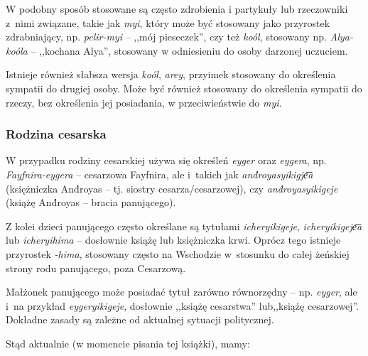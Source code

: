 \begin{spacing}{1.1}
W podobny sposób stosowane są często zdrobienia i partykuły lub rzeczowniki
z~nimi związane, takie jak \emph{myi}, który może być stosowany jako przyrostek
zdrabniający, np. \emph{pelir-myi} -- ,,mój pieseczek'', czy też \emph{koól},
stosowany np. \emph{Alya-koóla} -- ,,kochana Alya'', stosowany w odniesieniu do
osoby darzonej uczuciem.

Istnieje również słabsza wersja \emph{koól}, \emph{arey}, przyimek stosowany do
określenia sympatii do drugiej osoby. Może być również stosowany do określenia
sympatii do rzeczy, bez określenia jej posiadania, w przeciwieństwie do
\emph{myi}.

\subsubsection{Rodzina cesarska}

W przypadku rodziny cesarskiej używa się określeń \emph{eyger} oraz
\emph{eygera}, np. \emph{Fayfnira-eygera} -- cesarzowa Fayfnira, ale i~takich
jak \emph{and́royasyikigje͞a} (księżniczka And́royas -- tj. siostry
cesarza/cesarzowej), czy \emph{and́royasyikigeje} (książę And́royas -- bracia
panującego).

Z kolei dzieci panującego często określane są tytułami \emph{icheryikigeje},
\emph{icheryikigeje͞a} lub \emph{icheryihima} -- dosłownie książę lub
księżniczka krwi. Oprócz tego istnieje przyrostek \emph{-hima}, stosowany często
na Wschodzie w~stosunku do całej żeńskiej strony rodu panującego, poza
Cesarzową.

Małżonek panującego może posiadać tytuł zarówno równorzędny -- np. \emph{eyger},
ale i~na przykład \emph{eygeryikigeje}, dosłownie ,,książę cesarstwa''
lub,,książę cesarzowej''. Dokładne zasady są zależne od aktualnej sytuacji
politycznej.

Stąd aktualnie (w momencie pisania tej książki), mamy:


\end{spacing}
